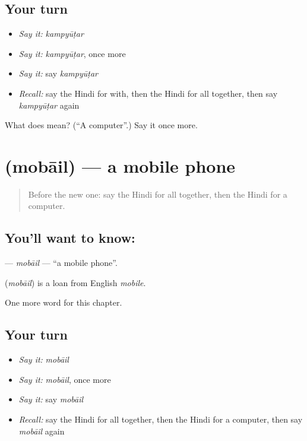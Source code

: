\subsection*{Your turn}
\begin{itemize}
\raggedright
  \item \emph{Say it:} \emph{kampyūṭar}
  \item \emph{Say it:} \emph{kampyūṭar}, once more
  \item \emph{Say it:} say \emph{kampyūṭar}
  \item \emph{Recall:} say the Hindi for with, then the Hindi for all together, then say \emph{kampyūṭar} again
\end{itemize}

\begin{tcolorbox}[breakable,colback=teal!4,colframe=teal!35!black,title={Before you move on}]
What does  mean? (\textquotedblleft{}A computer\textquotedblright{}.) Say it once more.
\end{tcolorbox}
\section[\texorpdfstring{\hi{मोबाइल} (mobāil)}{मोबाइल (mobāil)}]{ (mobāil) — a mobile phone}

\label{lesson:HI-C249-mobail}



\begin{quote}
Before the new one: say the Hindi for all together, then the Hindi for a computer.
\end{quote}

\subsection*{You'll want to know: }
\textbf{} — \emph{mobāil} — \textquotedblleft{}a mobile phone\textquotedblright{}.

\begin{cousinweb}
\textbf{} (\emph{mobāil}) is a loan from English \emph{mobile}.
\end{cousinweb}

\begin{grammarlens}[title={What you've built}]
One more word for this chapter.
\end{grammarlens}

\subsection*{Your turn}
\begin{itemize}
\raggedright
  \item \emph{Say it:} \emph{mobāil}
  \item \emph{Say it:} \emph{mobāil}, once more
  \item \emph{Say it:} say \emph{mobāil}
  \item \emph{Recall:} say the Hindi for all together, then the Hindi for a computer, then say \emph{mobāil} again
\end{itemize}

